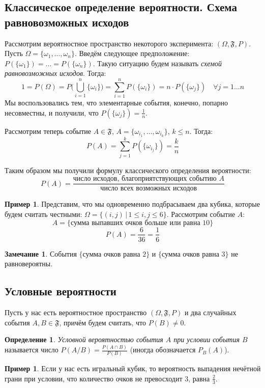 \documentclass[11pt,openany,a4paper]{scrartcl}
\theoremstyle{plain}
\theoremstyle{definition}
\newtheorem{definition}[theorem]{Определение}
\newtheorem{remark}[theorem]{Замечание}
\newtheorem{example}[theorem]{Пример}
\begin{document}
\subsection{Классическое определение вероятности. Схема равновозможных исходов}

Рассмотрим вероятностное пространство некоторого эксперимента: $(\Omega, \mathfrak F, P)$.
Пусть $\Omega = \{\omega_1, \ldots, \omega_n\}$. Введём следующее предположение:
$P(\{\omega_1\}) = \ldots = P(\{\omega_n\})$. Такую ситуацию будем называть
\emph{схемой равновозможных исходов}. Тогда:
$$
1 = P(\Omega) = P\bigg(\bigcup\limits_{i=1}^n \{\omega_i\}\bigg) =
\sum\limits_{i=1}^n P(\{\omega_i\}) = n \cdot P(\{\omega_j\})\quad \forall j=1\ldots n
$$
Мы воспользовались тем, что элементарные события, конечно, попарно несовместны,
и получили, что $P(\{\omega_j\}) = \frac{1}{n}$.

Рассмотрим теперь событие $A \in \mathfrak F$, $A = \{\omega_{i_1}, \ldots, \omega_{i_k}\}$,
$k \leqslant n$. Тогда:
$$
P(A) = \sum\limits_{j=1}^k P(\{\omega_{i_j}\}) = \frac{k}{n}
$$

Таким образом мы получили формулу классического определения вероятности:
$$
P(A) = \frac{\text{число исходов, благоприятствующих событию } A}
{\text{число всех возможных исходов}}
$$

\begin{example}
    Представим, что мы одновременно подбрасываем два кубика, которые будем считать честными:
    $\Omega = \{ (i, j)\,|\, 1 \leqslant i,j \leqslant 6\}$. Рассмотрим событие $A$:
    $$
    A = \{\text{сумма выпавших очков больше или равна }10\}
    $$
    $$
    P(A) = \frac{6}{36} = \frac{1}{6}
    $$
\end{example}
\begin{remark}
    События $\{\text{сумма очков равна } 2\}$ и $\{\text{сумма очков равна } 3\}$ не равновероятны.
\end{remark}

\subsection{Условные вероятности}

Пусть у нас есть вероятностное пространство $(\Omega, \mathfrak{F}, P)$ и два случайных 
события $A,B \in \mathfrak{F}$, причём будем считать, что $P(B) \neq 0$.

\begin{definition}
    \emph{Условной вероятностью события $A$ при условии события $B$} называется число
    $P(A/B) = \frac{P(A \cap B)}{P(B)}$ (иногда обозначается $P_B(A)$).
\end{definition}
\begin{example}
    Если у нас есть игральный кубик, то вероятность выпадения нечётной грани при 
    условии, что количество очков не превосходит $3$, равна $\frac{2}{3}$.
\end{example}
\end{document}

